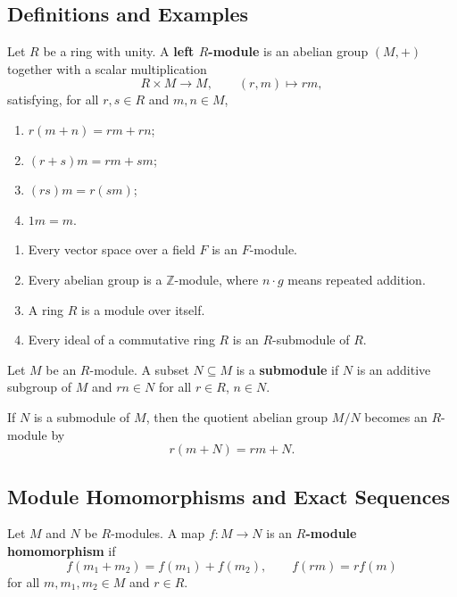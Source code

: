 \subsection{Definitions and Examples}

\begin{definition}[$R$-Module]
Let $R$ be a ring with unity. A \textbf{left $R$-module} is an abelian group $(M,+)$ together with a scalar multiplication
\[
    R\times M\to M,
    \qquad
    (r,m)\mapsto rm,
\]
satisfying, for all $r,s\in R$ and $m,n\in M$,
\begin{enumerate}
    \item $r(m+n)=rm+rn$;
    \item $(r+s)m=rm+sm$;
    \item $(rs)m=r(sm)$;
    \item $1m=m$.
\end{enumerate}
\end{definition}

\begin{example}
\begin{enumerate}
    \item Every vector space over a field $F$ is an $F$-module.
    \item Every abelian group is a $\mathbb{Z}$-module, where $n\cdot g$ means repeated addition.
    \item A ring $R$ is a module over itself.
    \item Every ideal of a commutative ring $R$ is an $R$-submodule of $R$.
\end{enumerate}
\end{example}

\begin{definition}[Submodule]
Let $M$ be an $R$-module. A subset $N\subseteq M$ is a \textbf{submodule} if $N$ is an additive subgroup of $M$ and $rn\in N$ for all $r\in R$, $n\in N$.
\end{definition}

\begin{definition}
If $N$ is a submodule of $M$, then the quotient abelian group $M/N$ becomes an $R$-module by
\[
    r(m+N)=rm+N.
\]
\end{definition}

\subsection{Module Homomorphisms and Exact Sequences}

\begin{definition}
Let $M$ and $N$ be $R$-modules. A map $f:M\to N$ is an \textbf{$R$-module homomorphism} if
\[
    f(m_1+m_2)=f(m_1)+f(m_2),
    \qquad
    f(rm)=rf(m)
\]
for all $m,m_1,m_2\in M$ and $r\in R$.
\end{definition}

